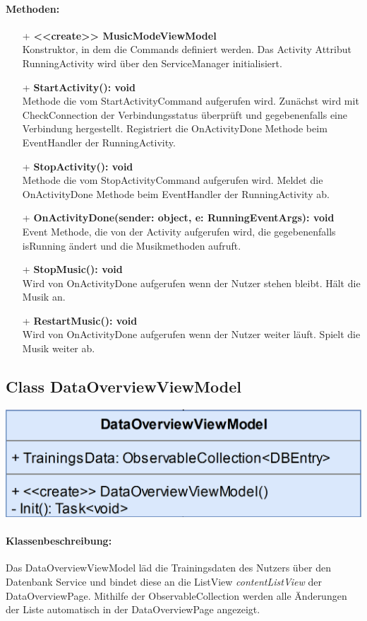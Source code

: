 \documentclass[a4paper,12pt]{article}
\begin{document}
\paragraph{Methoden:}
\begin{itemize}
	\item[+] \textbf{<<create>> MusicModeViewModel} \\ Konstruktor, in dem die Commands definiert werden. Das Activity Attribut RunningActivity wird über den ServiceManager initialisiert.
	\item[+] \textbf{StartActivity(): void} \\ Methode die vom StartActivityCommand aufgerufen wird. Zunächst wird mit CheckConnection der Verbindungsstatus überprüft und gegebenenfalls eine Verbindung hergestellt. Registriert die OnActivityDone Methode beim EventHandler der RunningActivity. 
	\item[+] \textbf{StopActivity(): void} \\ Methode die vom StopActivityCommand aufgerufen wird. Meldet die OnActivityDone Methode beim EventHandler der RunningActivity ab. 
	\item[+] \textbf{OnActivityDone(sender: object, e: RunningEventArgs): void} \\ Event Methode, die von der Activity aufgerufen wird, die gegebenenfalls isRunning ändert und die Musikmethoden aufruft.
	\item[+] \textbf{StopMusic(): void} \\ Wird von OnActivityDone aufgerufen wenn der Nutzer stehen bleibt. Hält die Musik an.
	\item[+] \textbf{RestartMusic(): void} \\ Wird von OnActivityDone aufgerufen wenn der Nutzer weiter läuft. Spielt die Musik weiter ab.
\end{itemize}

	\subsection{Class DataOverviewViewModel}

	\includegraphics[width=0.5\linewidth]{bilder/ViewModelKlassen/DataOverviewViewModel.png}

\paragraph{Klassenbeschreibung:}
Das DataOverviewViewModel läd die Trainingsdaten des Nutzers über den Datenbank Service und bindet diese an die ListView \textit{contentListView} der DataOverviewPage.
Mithilfe der ObservableCollection werden alle Änderungen der Liste automatisch in der DataOverviewPage angezeigt.
\end{document}
